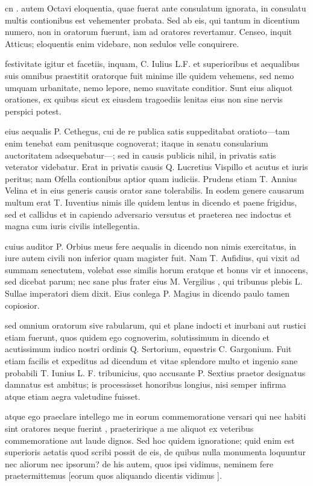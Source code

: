  cn . autem Octavi eloquentia, quae fuerat ante consulatum ignorata, in consulatu multis contionibus est vehementer probata. Sed ab eis, qui tantum in dicentium numero, non in oratorum fuerunt, iam ad oratores revertamur. Censeo, inquit Atticus; eloquentis enim videbare, non sedulos velle conquirere.

 festivitate igitur et facetiis, inquam, C. Iulius L.F. et superioribus et aequalibus suis omnibus praestitit oratorque fuit minime ille quidem vehemens, sed nemo umquam urbanitate, nemo lepore, nemo suavitate conditior. Sunt eius aliquot orationes, ex quibus sicut ex eiusdem tragoediis lenitas eius non sine nervis perspici potest.

 eius aequalis P. Cethegus, cui de re publica satis suppeditabat oratioto—tam enim tenebat eam penitusque cognoverat; itaque in senatu consularium auctoritatem adsequebatur—; sed in causis publicis nihil, in privatis satis veterator videbatur. Erat in privatis causis Q. Lucretius Vispillo et acutus et iuris peritus; nam Ofella contionibus aptior quam iudiciis. Prudens etiam T. Annius Velina et in eius generis causis orator sane tolerabilis. In eodem genere causarum multum erat T. Iuventius nimis ille quidem lentus in dicendo et paene frigidus, sed et callidus et in capiendo adversario versutus et praeterea nec indoctus et magna cum iuris civilis intellegentia.

 cuius auditor P. Orbius meus fere aequalis in dicendo non nimis exercitatus, in iure autem civili non inferior quam magister fuit. Nam T. Aufidius, qui vixit ad summam senectutem, volebat esse similis horum eratque et bonus vir et innocens, sed dicebat parum; nec sane plus frater eius M. Vergilius , qui tribunus plebis L. Sullae imperatori diem dixit. Eius conlega P. Magius in dicendo paulo tamen copiosior.

 sed omnium oratorum sive rabularum, qui et plane indocti et inurbani aut rustici etiam fuerunt, quos quidem ego cognoverim, solutissimum in dicendo et acutissimum iudico nostri ordinis Q. Sertorium, equestris C. Gargonium. Fuit etiam facilis et expeditus ad dicendum et vitae splendore multo et ingenio sane probabili T. Iunius L. F. tribunicius, quo accusante P. Sextius praetor designatus damnatus est ambitus; is processisset honoribus longius, nisi semper infirma atque etiam aegra valetudine fuisset.

 atque ego praeclare intellego me in eorum commemoratione versari qui nec habiti sint oratores neque fuerint , praeteririque a me aliquot ex veteribus commemoratione aut laude dignos. Sed hoc quidem ignoratione; quid enim est superioris aetatis quod scribi possit de eis, de quibus nulla monumenta loquuntur nec aliorum nec ipsorum? de his autem, quos ipsi vidimus, neminem fere praetermittemus [eorum quos aliquando dicentis vidimus ].

